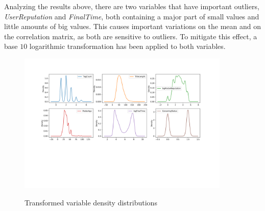 \documentclass[11pt]{book} %
\begin{document}
      Analyzing the results above, there are two variables that have important outliers, \emph{UserReputation} and \emph{FinalTime}, both containing a major part of small values and little amounts of big values. This causes important variations on the mean and on the correlation matrix, as both are sensitive to outliers. To mitigate this effect, a base $10$ logarithmic transformation has been applied to both variables.

      \begin{figure}[!ht]
        \includegraphics[width=0.9\textwidth]{variables_density_distribution_log.png}
        \label{img:density}
        \caption{Transformed variable density distributions}
      \end{figure}
\end{document}
